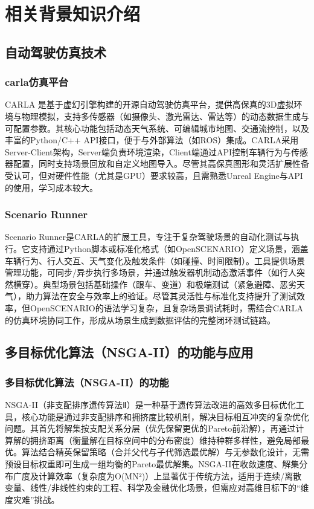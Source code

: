 \chapter{相关背景知识介绍}
\section{自动驾驶仿真技术}
\subsection{carla仿真平台}

CARLA 是基于虚幻引擎构建的开源自动驾驶仿真平台，提供高保真的3D虚拟环境与物理模拟，支持多传感器（如摄像头、激光雷达、雷达等）的动态数据生成与可配置参数。其核心功能包括动态天气系统、可编辑城市地图、交通流控制，以及丰富的Python/C++ API接口，便于与外部算法（如ROS）集成。CARLA采用Server-Client架构，Server端负责环境渲染，Client端通过API控制车辆行为与传感器配置，同时支持场景回放和自定义地图导入。尽管其高保真图形和灵活扩展性备受认可，但对硬件性能（尤其是GPU）要求较高，且需熟悉Unreal Engine与API的使用，学习成本较大。

\subsection{Scenario Runner}


Scenario Runner是CARLA的扩展工具，专注于复杂驾驶场景的自动化测试与执行。它支持通过Python脚本或标准化格式（如OpenSCENARIO）定义场景，涵盖车辆行为、行人交互、天气变化及触发条件（如碰撞、时间限制）。工具提供场景管理功能，可同步/异步执行多场景，并通过触发器机制动态激活事件（如行人突然横穿）。典型场景包括基础操作（跟车、变道）和极端测试（紧急避障、恶劣天气），助力算法在安全与效率上的验证。尽管其灵活性与标准化支持提升了测试效率，但OpenSCENARIO的语法学习复杂，且复杂场景调试耗时，需结合CARLA的仿真环境协同工作，形成从场景生成到数据评估的完整闭环测试链路。

\section{多目标优化算法（NSGA-II）的功能与应用}

\subsection{多目标优化算法（NSGA-II）的功能}

NSGA-II（非支配排序遗传算法Ⅱ）是一种基于遗传算法改进的高效多目标优化工具，核心功能是通过非支配排序和拥挤度比较机制，解决目标相互冲突的复杂优化问题。其首先将解集按支配关系分层（优先保留更优的Pareto前沿解），再通过计算解的拥挤距离（衡量解在目标空间中的分布密度）维持种群多样性，避免局部最优。算法结合精英保留策略（合并父代与子代筛选最优解）与无参数化设计，无需预设目标权重即可生成一组均衡的Pareto最优解集。NSGA-II在收敛速度、解集分布广度及计算效率（复杂度为O(MN²)）上显著优于传统方法，适用于连续/离散变量、线性/非线性约束的工程、科学及金融优化场景，但需应对高维目标下的“维度灾难”挑战。

